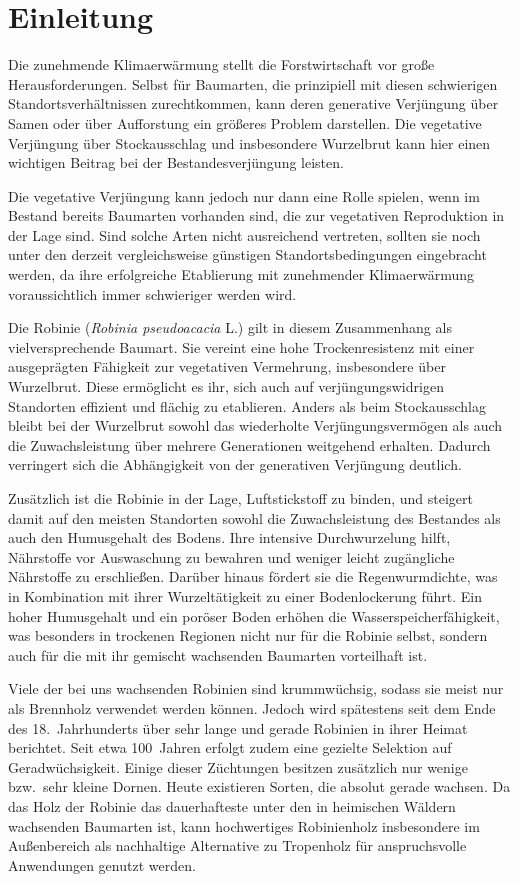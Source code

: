 \documentclass[twocolumn]{scrartcl}
\begin{document}
\tableofcontents

\section{Einleitung}

Die zunehmende Klimaerwärmung stellt die Forstwirtschaft vor große
Herausforderungen. Selbst für Baumarten, die prinzipiell mit diesen
schwierigen Standortsverhältnissen zurechtkommen, kann deren
generative Verjüngung über Samen oder über Aufforstung ein größeres
Problem darstellen. Die vegetative Verjüngung über Stockausschlag und
insbesondere Wurzelbrut kann hier einen wichtigen Beitrag bei der
Bestandesverjüngung leisten.

Die vegetative Verjüngung kann jedoch nur dann eine Rolle spielen,
wenn im Bestand bereits Baumarten vorhanden sind, die zur vegetativen
Reproduktion in der Lage sind. Sind solche Arten nicht ausreichend
vertreten, sollten sie noch unter den derzeit vergleichsweise
günstigen Standortsbedingungen eingebracht werden, da ihre
erfolgreiche Etablierung mit zunehmender Klimaerwärmung
voraussichtlich immer schwieriger werden wird.

Die Robinie (\emph{Robinia pseudoacacia} L.) gilt in diesem
Zusammenhang als vielversprechende Baumart. Sie vereint eine hohe
Trockenresistenz mit einer ausgeprägten Fähigkeit zur vegetativen
Vermehrung, insbesondere über Wurzelbrut. Diese ermöglicht es ihr,
sich auch auf verjüngungswidrigen Standorten effizient und flächig zu
etablieren. Anders als beim Stockausschlag bleibt bei der Wurzelbrut
sowohl das wiederholte Verjüngungsvermögen als auch die
Zuwachsleistung über mehrere Generationen weitgehend erhalten. Dadurch
verringert sich die Abhängigkeit von der generativen Verjüngung
deutlich.

Zusätzlich ist die Robinie in der Lage, Luftstickstoff zu binden, und
steigert damit auf den meisten Standorten sowohl die Zuwachsleistung
des Bestandes als auch den Humusgehalt des Bodens. Ihre intensive
Durchwurzelung hilft, Nährstoffe vor Auswaschung zu bewahren und
weniger leicht zugängliche Nährstoffe zu erschließen. Darüber hinaus
fördert sie die Regenwurmdichte, was in Kombination mit ihrer
Wurzeltätigkeit zu einer Bodenlockerung führt. Ein hoher Humusgehalt
und ein poröser Boden erhöhen die Wasserspeicherfähigkeit, was
besonders in trockenen Regionen nicht nur für die Robinie selbst,
sondern auch für die mit ihr gemischt wachsenden Baumarten vorteilhaft
ist.

Viele der bei uns wachsenden Robinien sind krummwüchsig, sodass sie
meist nur als Brennholz verwendet werden können. Jedoch wird
spätestens seit dem Ende des 18.\ Jahrhunderts über sehr lange und
gerade Robinien in ihrer Heimat berichtet. Seit etwa 100~Jahren
erfolgt zudem eine gezielte Selektion auf Geradwüchsigkeit. Einige
dieser Züchtungen besitzen zusätzlich nur wenige bzw.\ sehr kleine
Dornen. Heute existieren Sorten, die absolut gerade wachsen. Da das
Holz der Robinie das dauerhafteste unter den in heimischen Wäldern
wachsenden Baumarten ist, kann hochwertiges Robinienholz insbesondere
im Außenbereich als nachhaltige Alternative zu Tropenholz für
anspruchsvolle Anwendungen genutzt werden.
\end{document}
